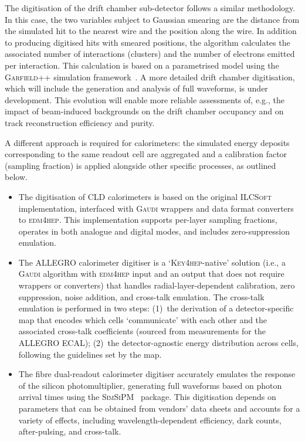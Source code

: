 The digitisation of the drift chamber sub-detector follows a similar methodology. 
In this case, the two variables subject to Gaussian smearing are the distance from the simulated hit to the nearest wire 
and the position along the wire. 
In addition to producing digitised hits with smeared positions, 
the algorithm calculates the associated number of interactions (clusters) and the number of electrons emitted per interaction. 
This calculation is based on a parametrised model using the \textsc{Garfield++} simulation framework~\cite{clustercount}. 
A more detailed drift chamber digitisation, which will include the generation and analysis of full waveforms, is under development. 
This evolution will enable more reliable assessments of, e.g., the impact of beam-induced backgrounds on the drift chamber occupancy and on track reconstruction efficiency and purity.

A different approach is required for calorimeters: 
the simulated energy deposits corresponding to the same readout cell are aggregated
and a calibration factor (sampling fraction) is applied alongside other specific processes, as outlined below. 
\begin{itemize}
\item The digitisation of CLD calorimeters is based on the original \textsc{ILCSoft} implementation, interfaced with \textsc{Gaudi} wrappers and data format converters to \textsc{edm4hep}. This implementation supports per-layer sampling fractions, operates in both analogue and digital modes,
and includes zero-suppression emulation.

\item The ALLEGRO calorimeter digitiser is a ‘\textsc{Key4hep}-native’ solution 
(i.e., a \textsc{Gaudi} algorithm with \textsc{edm4hep} input and an output that does not require wrappers or converters) 
that handles radial-layer-dependent calibration, zero suppression, noise addition, and cross-talk emulation. 
The cross-talk emulation is performed in two steps: 
(1)~the derivation of a detector-specific map that encodes which cells ‘communicate’ with each other 
and the associated cross-talk coefficients (sourced from measurements for the ALLEGRO ECAL);
(2)~the detector-agnostic energy distribution across cells, following the guidelines set by the map.

\item The fibre dual-readout calorimeter digitiser accurately emulates the response of the silicon photomultiplier,
generating full waveforms based on photon arrival times using the \textsc{SimSiPM}~\cite{simsipm} package. 
This digitisation depends on parameters that can be obtained from vendors’ data sheets and accounts for a variety of effects, 
including wavelength-dependent efficiency, dark counts, after-pulsing, and cross-talk.

\end{itemize}

